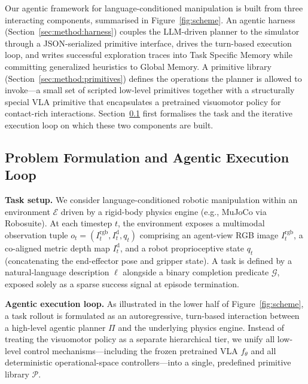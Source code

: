 \documentclass{article}
\begin{document}
	Our agentic framework for language-conditioned manipulation is built from three interacting components, summarised in Figure~\ref{fig:scheme}. An agentic harness (Section~\ref{sec:method:harness}) couples the LLM-driven planner to the simulator through a JSON-serialized primitive interface, drives the turn-based execution loop, and writes successful exploration traces into Task Specific Memory while committing generalized heuristics to Global Memory. A primitive library (Section~\ref{sec:method:primitives}) defines the operations the planner is allowed to invoke---a small set of scripted low-level primitives together with a structurally special VLA primitive that encapsulates a pretrained visuomotor policy for contact-rich interactions. Section~\ref{sec:method:formulation} first formalises the task and the iterative execution loop on which these two components are built.

	\subsection{Problem Formulation and Agentic Execution Loop}
	\label{sec:method:formulation}

	\textbf{Task setup.} We consider language-conditioned robotic manipulation within an environment $\mathcal{E}$ driven by a rigid-body physics engine (e.g., MuJoCo via Robosuite). At each timestep $t$, the environment exposes a multimodal observation tuple $o_t = (I_t^{\text{rgb}}, I_t^{\text{d}}, q_t)$ comprising an agent-view RGB image $I_t^{\text{rgb}}$, a co-aligned metric depth map $I_t^{\text{d}}$, and a robot proprioceptive state $q_t$ (concatenating the end-effector pose and gripper state). A task is defined by a natural-language description $\ell$ alongside a binary completion predicate $\mathcal{G}$, exposed solely as a sparse success signal at episode termination.

	\textbf{Agentic execution loop.} As illustrated in the lower half of Figure~\ref{fig:scheme}, a task rollout is formulated as an autoregressive, turn-based interaction between a high-level agentic planner $\Pi$ and the underlying physics engine. Instead of treating the visuomotor policy as a separate hierarchical tier, we unify all low-level control mechanisms---including the frozen pretrained VLA $f_\theta$ and all deterministic operational-space controllers---into a single, predefined primitive library $\mathcal{P}$.
\end{document}
